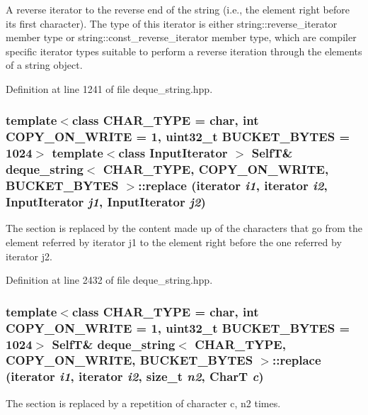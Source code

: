 A reverse iterator to the reverse end of the string (i.e., the element right before its first character). The type of this iterator is either string::reverse\_\-iterator member type or string::const\_\-reverse\_\-iterator member type, which are compiler specific iterator types suitable to perform a reverse iteration through the elements of a string object. 

Definition at line 1241 of file deque\_\-string.hpp.\hypertarget{classdeque__string_ff80cea2a38afc2b7200c8bc4358e5c5}{
\subsubsection[{replace}]{\setlength{\rightskip}{0pt plus 5cm}template$<$class CHAR\_\-TYPE  = char, int COPY\_\-ON\_\-WRITE = 1, uint32\_\-t BUCKET\_\-BYTES = 1024$>$ template$<$class InputIterator $>$ {\bf SelfT}\& {\bf deque\_\-string}$<$ CHAR\_\-TYPE, COPY\_\-ON\_\-WRITE, BUCKET\_\-BYTES $>$::replace (iterator {\em i1}, \/  iterator {\em i2}, \/  InputIterator {\em j1}, \/  InputIterator {\em j2})}}
\label{classdeque__string_ff80cea2a38afc2b7200c8bc4358e5c5}


The section is replaced by the content made up of the characters that go from the element referred by iterator j1 to the element right before the one referred by iterator j2. 

Definition at line 2432 of file deque\_\-string.hpp.\hypertarget{classdeque__string_798d6054dc0ae68df66899275d199c31}{
\subsubsection[{replace}]{\setlength{\rightskip}{0pt plus 5cm}template$<$class CHAR\_\-TYPE  = char, int COPY\_\-ON\_\-WRITE = 1, uint32\_\-t BUCKET\_\-BYTES = 1024$>$ {\bf SelfT}\& {\bf deque\_\-string}$<$ CHAR\_\-TYPE, COPY\_\-ON\_\-WRITE, BUCKET\_\-BYTES $>$::replace (iterator {\em i1}, \/  iterator {\em i2}, \/  size\_\-t {\em n2}, \/  CharT {\em c})}}
\label{classdeque__string_798d6054dc0ae68df66899275d199c31}


The section is replaced by a repetition of character c, n2 times. 

